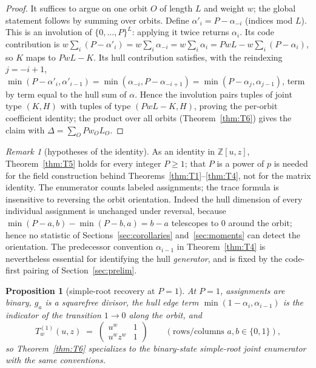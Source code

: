 \documentclass[11pt]{article}
\newtheorem{proposition}[theorem]{Proposition}
\theoremstyle{definition}
\theoremstyle{remark}
\newtheorem*{remark}{Remark}
\newcommand{\Z}{\mathbb{Z}}
\begin{document}
\begin{proof}
It suffices to argue on one orbit \(O\) of length \(L\) and weight \(w\);
the global statement follows by summing over orbits. Define
\(\alpha'_i = P - \alpha_{-i}\) (indices mod \(L\)). This is an
involution of \(\{0,\dots,P\}^L\): applying it twice returns
\(\alpha_i\). Its code contribution is
\(w \sum_i (P-\alpha'_i) = w \sum_i \alpha_{-i} = w \sum_i \alpha_i
= PwL - w\sum_i (P-\alpha_i)\), so \(K\) maps to \(PwL - K\). Its hull
contribution satisfies, with the reindexing \(j = -i+1\),
\(\min(P-\alpha'_i, \alpha'_{i-1}) = \min(\alpha_{-i}, P-\alpha_{-i+1})
= \min(P-\alpha_j, \alpha_{j-1})\),
term by term equal to the hull sum of \(\alpha\). Hence the involution
pairs tuples of joint type \((K,H)\) with tuples of type
\((PwL-K, H)\), proving the per-orbit coefficient identity; the product
over all orbits (Theorem~\ref{thm:T6}) gives the claim with
\(\Delta = \sum_O Pw_OL_O\).
\end{proof}

\begin{remark}[hypotheses of the identity]
As an identity in \(\Z[u,z]\), Theorem~\ref{thm:T5} holds for every
integer \(P \ge 1\); that \(P\) is a power of \(p\) is needed
for the field construction behind Theorems~\ref{thm:T1}--\ref{thm:T4},
not for the matrix identity. The enumerator counts labeled assignments;
the trace formula is insensitive to reversing the orbit orientation.
Indeed the hull dimension of every individual assignment is unchanged
under reversal, because
\(\min(P-a,b) - \min(P-b,a) = b - a\) telescopes to \(0\) around the
orbit; hence no statistic of Sections~\ref{sec:corollaries}
and~\ref{sec:moments} can detect the orientation. The predecessor
convention \(\alpha_{i-1}\) in Theorem~\ref{thm:T4} is nevertheless
essential for identifying the hull \emph{generator}, and is fixed by
the code-first pairing of Section~\ref{sec:prelim}.
\end{remark}

\begin{proposition}[simple-root recovery at \(P=1\)]\label{prop:P1}
At \(P = 1\), assignments are binary, \(g_a\) is a
squarefree divisor, the hull edge term \(\min(1-\alpha_i, \alpha_{i-1})\)
is the indicator of the transition \(1 \to 0\) along the orbit, and
\[
T^{(1)}_w(u,z) \;=\;
\begin{pmatrix} u^w & 1 \\ u^w z^w & 1 \end{pmatrix}
\qquad (\text{rows/columns } a,b \in \{0,1\}),
\]
so Theorem~\ref{thm:T6} specializes to the binary-state simple-root
joint enumerator with the same conventions.
\end{proposition}
\end{document}
